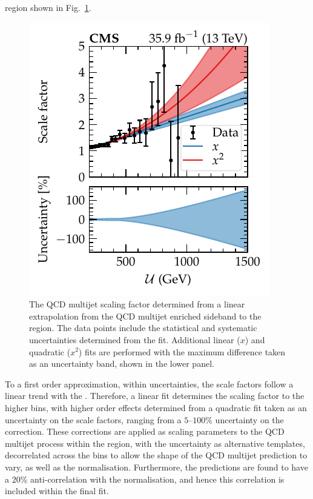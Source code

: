 \metplusjets region shown in Fig.~\ref{fig:qcd_estimation}.
%
\begin{figure}
    \centering
    \includegraphics{chapters/042_backgrounds/images/qcd_estimation.pdf}
    \caption[QCD multijet scaling factor for the signal region.]{
        The QCD multijet scaling factor determined from a linear extrapolation from the QCD multijet enriched sideband to the \metplusjets region. The data points include the statistical and systematic uncertainties determined from the fit. Additional linear ($x$) and quadratic ($x^2$) fits are performed with the maximum difference taken as an uncertainty band, shown in the lower panel.
    }
    \label{fig:qcd_estimation}
\end{figure}
%
To a first order approximation, within uncertainties, the scale factors follow
a linear trend with the \recoil. Therefore, a linear fit determines the
scaling factor to the higher \recoil bins, with higher order effects
determined from a quadratic fit taken as an uncertainty on the scale factors,
ranging from a $5$--$100\%$ uncertainty on the correction. These corrections
are applied as scaling parameters to the QCD multijet process within the
\metplusjets region, with the uncertainty as alternative templates,
decorrelated across the \recoil bins to allow the shape of the QCD multijet
prediction to vary, as well as the normalisation. Furthermore, the predictions
are found to have a $20\%$ anti-correlation with the \IZvvj normalisation, and
hence this correlation is included within the final fit.


